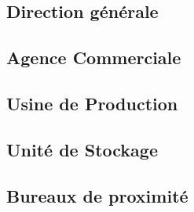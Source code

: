 \documentclass{article}
\begin{document}
\subsection{Direction générale}



\subsection{Agence Commerciale}



\subsection{Usine de Production}



\subsection{Unité de Stockage}



\subsection{Bureaux de proximité}


\end{document}

